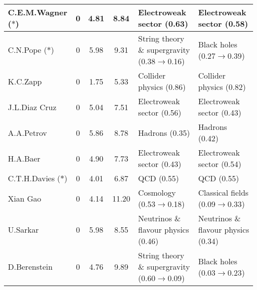 \begin{table}[H]
\begin{tabular}{p{}|c|c|c|b{}|b{}}
C.E.M.Wagner ($\ast$) &     0 &          4.81 &          8.84 &                     Electroweak sector (0.63) &           Electroweak sector (0.58)\\ \hline
    C.N.Pope ($\ast$) &     0 &          5.98 &          9.31 & String theory \& supergravity (0.38$\to$0.16) &         Black holes (0.27$\to$0.39)\\ \hline
             K.C.Zapp &     0 &          1.75 &          5.33 &                       Collider physics (0.86) &             Collider physics (0.82)\\ \hline
        J.L.Diaz Cruz &     0 &          5.04 &          7.51 &                     Electroweak sector (0.56) &           Electroweak sector (0.43)\\ \hline
           A.A.Petrov &     0 &          5.86 &          8.78 &                                Hadrons (0.35) &                      Hadrons (0.42)\\ \hline
             H.A.Baer &     0 &          4.90 &          7.73 &                     Electroweak sector (0.43) &           Electroweak sector (0.54)\\ \hline
C.T.H.Davies ($\ast$) &     0 &          4.01 &          6.87 &                                    QCD (0.55) &                          QCD (0.55)\\ \hline
             Xian Gao &     0 &          4.14 &         11.20 &                     Cosmology (0.53$\to$0.18) &    Classical fields (0.09$\to$0.33)\\ \hline
             U.Sarkar &     0 &          5.98 &          8.55 &           Neutrinos \& flavour physics (0.46) & Neutrinos \& flavour physics (0.34)\\ \hline
         D.Berenstein &     0 &          4.76 &          9.89 & String theory \& supergravity (0.60$\to$0.09) &         Black holes (0.03$\to$0.23)\\ \hline
\bottomrule
\end{tabular}
\end{table}
